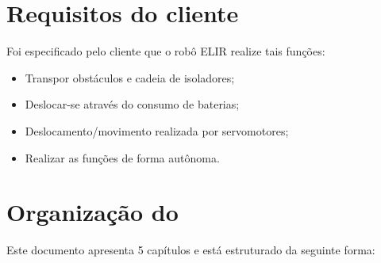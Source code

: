 %


\section{Requisitos do cliente}
\label{sec:reqc}
Foi especificado pelo cliente que o robô ELIR realize tais funções:

\begin{itemize}
	
	\item Transpor obstáculos e cadeia de isoladores;
	\item Deslocar-se através do consumo de baterias;
	\item Deslocamento/movimento realizada por servomotores;
	\item Realizar as funções de forma autônoma.
	
\end{itemize}


\section{Organização do \thetypework}
\label{section:organizacao}

Este documento apresenta 5 capítulos e está estruturado da seguinte forma:

